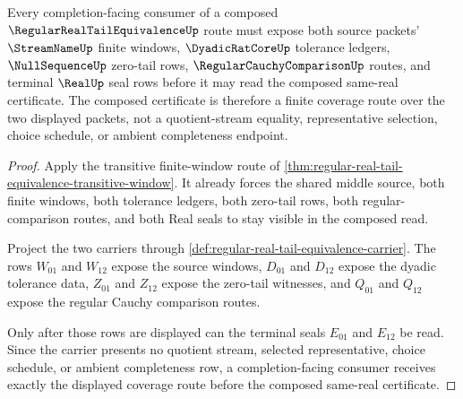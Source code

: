 \begin{theorem}
\label{thm:regular-real-tail-transitive-window-coverage}
Every completion-facing consumer of a composed
$\RegularRealTailEquivalenceUp$ route must expose both source packets'
$\StreamNameUp$ finite windows, $\DyadicRatCoreUp$ tolerance ledgers,
$\NullSequenceUp$ zero-tail rows, $\RegularCauchyComparisonUp$ routes, and
terminal $\RealUp$ seal rows before it may read the composed same-real
certificate. The composed certificate is therefore a finite coverage route over
the two displayed packets, not a quotient-stream equality, representative
selection, choice schedule, or ambient completeness endpoint.
\end{theorem}
\begin{proof}
Apply the transitive finite-window route of
\autoref{thm:regular-real-tail-equivalence-transitive-window}. It already
forces the shared middle source, both finite windows, both tolerance ledgers,
both zero-tail rows, both regular-comparison routes, and both Real seals to stay
visible in the composed read.

Project the two carriers through
\autoref{def:regular-real-tail-equivalence-carrier}. The rows $W_{01}$ and
$W_{12}$ expose the source windows, $D_{01}$ and $D_{12}$ expose the dyadic
tolerance data, $Z_{01}$ and $Z_{12}$ expose the zero-tail witnesses, and
$Q_{01}$ and $Q_{12}$ expose the regular Cauchy comparison routes.

Only after those rows are displayed can the terminal seals $E_{01}$ and
$E_{12}$ be read. Since the carrier presents no quotient stream, selected
representative, choice schedule, or ambient completeness row, a
completion-facing consumer receives exactly the displayed coverage route before
the composed same-real certificate.
\end{proof}
